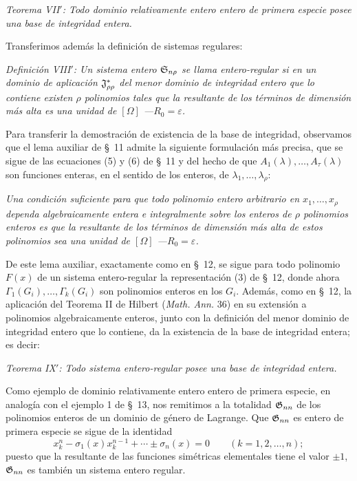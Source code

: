 \documentclass[11pt]{article}
\newcommand{\eps}{\varepsilon}
\begin{document}
\emph{Teorema VII$'$: Todo dominio relativamente entero entero de primera especie posee una base de integridad entera.}

Transferimos además la definición de sistemas regulares:

\emph{Definición VIII$'$: Un sistema entero $\mathfrak{S}_{n\rho}$ se llama entero-regular si en un dominio de aplicación $\mathfrak{J}^*_{\rho\rho}$ del menor dominio de integridad entero que lo contiene existen $\rho$ polinomios tales que la resultante de los términos de dimensión más alta es una unidad de $[\Omega]$ ---$R_0=\eps$.}

Para transferir la demostración de existencia de la base de integridad, observamos que el lema auxiliar de \S\ 11 admite la siguiente formulación más precisa, que se sigue de las ecuaciones (5) y (6) de \S\ 11 y del hecho de que $A_1(\lambda),\ldots,A_\tau(\lambda)$ son funciones enteras, en el sentido de los enteros, de $\lambda_1,\ldots,\lambda_\rho$:

\emph{Una condición suficiente para que todo polinomio entero arbitrario en $x_1,\ldots,x_\rho$ dependa algebraicamente entera e integralmente sobre los enteros de $\rho$ polinomios enteros es que la resultante de los términos de dimensión más alta de estos polinomios sea una unidad de $[\Omega]$ ---$R_0=\eps$.}

De este lema auxiliar, exactamente como en \S\ 12, se sigue para todo polinomio $F(x)$ de un sistema entero-regular la representación (3) de \S\ 12, donde ahora $\Gamma_1(G_i),\ldots,\Gamma_k(G_i)$ son polinomios enteros en los $G_i$. Además, como en \S\ 12, la aplicación del Teorema II de Hilbert (\emph{Math. Ann.} 36) en su extensión a polinomios algebraicamente enteros, junto con la definición del menor dominio de integridad entero que lo contiene, da la existencia de la base de integridad entera; es decir:

\emph{Teorema IX$'$: Todo sistema entero-regular posee una base de integridad entera.}

Como ejemplo de dominio relativamente entero entero de primera especie, en analogía con el ejemplo 1 de \S\ 13, nos remitimos a la totalidad $\mathfrak{G}_{nn}$ de los polinomios enteros de un dominio de género de Lagrange. Que $\mathfrak{G}_{nn}$ es entero de primera especie se sigue de la identidad
\[
  x_k^n-\sigma_1(x)x_k^{n-1}+\cdots\pm\sigma_n(x)=0
  \qquad(k=1,2,
\ldots,n);
\]
puesto que la resultante de las funciones simétricas elementales tiene el valor $\pm1$, $\mathfrak{G}_{nn}$ es también un sistema entero regular.
\end{document}
